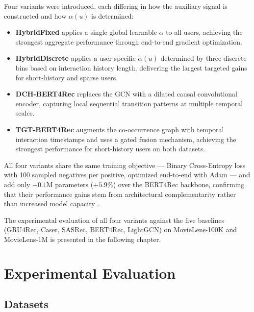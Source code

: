 \documentclass[12pt,a4paper]{report}
\newcommand{\parencite}[1]{\citep{#1}}
\begin{document}
Four variants were introduced, each differing in how the
auxiliary signal is constructed and how $\alpha(u)$ is
determined:

\begin{itemize}
  \item \textbf{HybridFixed} applies a single global learnable
        $\alpha$ to all users, achieving the strongest aggregate
        performance through end-to-end gradient optimization.

  \item \textbf{HybridDiscrete} applies a user-specific
        $\alpha(u)$ determined by three discrete bins based on
        interaction history length, delivering the largest
        targeted gains for short-history and sparse users.

  \item \textbf{DCH-BERT4Rec} replaces the GCN with a dilated
        causal convolutional encoder, capturing local sequential
        transition patterns at multiple temporal scales.

  \item \textbf{TGT-BERT4Rec} augments the co-occurrence graph
        with temporal interaction timestamps and uses a gated
        fusion mechanism, achieving the strongest performance
        for short-history users on both datasets.
\end{itemize}

All four variants share the same training objective --- Binary
Cross-Entropy loss with 100 sampled negatives per positive,
optimized end-to-end with Adam --- and add only $+0.1$M
parameters ($+5.9\%$) over the BERT4Rec backbone, confirming
that their performance gains stem from architectural
complementarity rather than increased model capacity
\parencite{ouledmeriem2025hybrid}.

The experimental evaluation of all four variants against the
five baselines (GRU4Rec, Caser, SASRec, BERT4Rec, LightGCN)
on MovieLens-100K and MovieLens-1M is presented in the
following chapter.



\chapter{Experimental Evaluation}

\section{Datasets}
\end{document}
